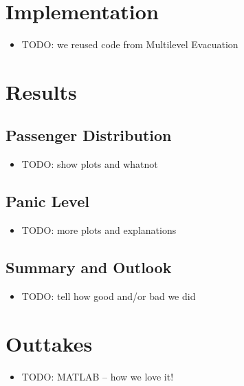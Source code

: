 \documentclass{beamer}
\begin{document}
\section{Implementation}
 
 \begin{frame}
  \begin{itemize}
   \item TODO: we reused code from Multilevel Evacuation
  \end{itemize}
 \end{frame}

\section{Results}

 \subsection{Passenger Distribution}
 \begin{frame}
  \begin{itemize}
   \item TODO: show plots and whatnot
  \end{itemize}
 \end{frame}

 \subsection{Panic Level}
 \begin{frame}
  \begin{itemize}
   \item TODO: more plots and explanations
  \end{itemize}
 \end{frame}

 \subsection{Summary and Outlook}
 \begin{frame}
  \begin{itemize}
   \item TODO: tell how good and/or bad we did
  \end{itemize}
 \end{frame}

\section{Outtakes}

 \begin{frame}
  \begin{itemize}
   \item TODO: MATLAB -- how we love it!
  \end{itemize}
 \end{frame}
\end{document}
